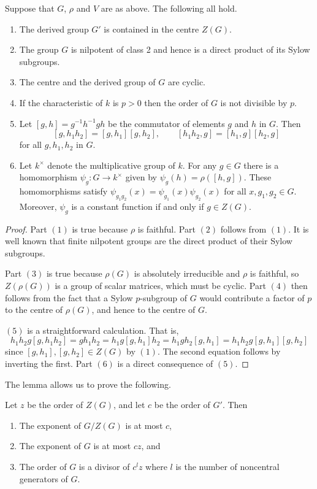 \begin{Lemm} \label{lem:facts}
Suppose that $G$, $\rho$ and $V$ are as above. The following all hold. 
\begin{enumerate}
\item The derived group $G'$ is contained in the centre $Z(G)$. 
\item The group $G$ is nilpotent of class 2 and hence is a direct 
product of its Sylow subgroups. 
\item The centre and the derived group of $G$ are cyclic.
\item If the characteristic of $k$ is $p > 0$ then 
the order of $G$ is not divisible by $p$.
\item Let $[g,h] = g^{-1}h^{-1}gh$ be the commutator of elements 
$g$ and $h$ in $G$. Then 
\[ 
[g,h_1h_2] = [g,h_1][g,h_2], \qquad [h_1h_2,g] = [h_1,g][h_2,g]
\] 
for all $g,h_1,h_2$ in $G$. 
\item Let $k^\times$ denote the multiplicative group of $k$. For any $g \in 
G$ there is a homomorphism 
$\psi_g:G \longrightarrow k^\times$ given by $\psi_g(h) = \rho([h,g])$. These
homomorphisms satisfy 
$\psi_{g_1g_2}(x) =
\psi_{g_1}(x)\psi_{g_2}(x)$ for all $x, g_1, g_2 \in G$.
Moreover, $\psi_g$ is a constant function if and only if $g \in Z(G)$.
\end{enumerate}
\end{Lemm}

\begin{proof}
Part $(1)$ is true because $\rho$ is faithful. 
Part $(2)$ follows from $(1)$.  It is
well known that finite nilpotent groups are the direct product of 
their Sylow subgroups. 

Part $(3)$ is true because $\rho(G)$ is 
absolutely irreducible and $\rho$ is faithful, 
so $Z(\rho(G))$ is a group of scalar matrices, 
which must be cyclic. 
Part $(4)$ then follows from the fact that a Sylow $p$-subgroup of $G$
would contribute a factor of $p$ to the centre of $\rho(G)$, and hence
to the centre of $G$.

$(5)$ is a straightforward calculation. That is,
\[
h_1 h_2 g [g, h_1 h_2] = g h_1 h_2 = h_1 g [g, h_1] h_2 = h_1 g h_2 [g, h_1] 
= h_1 h_2 g [g, h_1] [g, h_2]
\]
since $[g, h_1], [g,h_2] \in Z(G)$ by $(1)$. 
The second equation follows by inverting the first. 
Part $(6)$  is a direct
consequence of $(5)$.
\end{proof}

The lemma allows us to prove the following. 

\begin{Prop} \label{exponents}
Let $z$ be the order of $Z(G)$, and let $c$ be the 
order of $G'$. Then 
\begin{enumerate}
\item The exponent of $G/Z(G)$ is at most $c$, 
\item The exponent of $G$ is at most $cz$, and 
\item The order of $G$ is a divisor of $c^{l}z$ where $l$ is the number of 
noncentral generators of $G$.
\end{enumerate}
\end{Prop}

